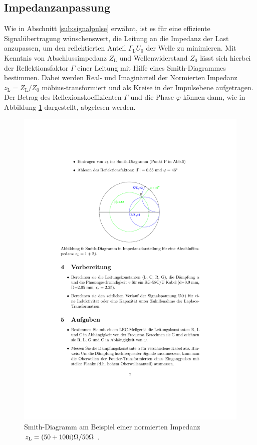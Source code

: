 \subsection{Impedanzanpassung} %
\label{sub:impedanzanpassung}
Wie in Abschnitt \ref{sub:signalpulse} erwähnt, ist es für eine effiziente
Signalübertragung wünschenswert, die Leitung an die Impedanz der Last
anzupassen, um den reflektierten Anteil $\Gamma_\text{L}U_0$ der Welle zu
minimieren.
Mit Kenntnis von Abschlussimpedanz $Z_\text{L}$ und Wellenwiderstand $Z_0$
lässt sich hierbei der Reflektionsfaktor $\Gamma$ einer Leitung mit Hilfe
eines Smith-Diagrammes bestimmen.
Dabei werden Real- und Imaginärteil der Normierten Impedanz
$z_\text{L} = Z_\text{L}/Z_0$ möbius-transformiert und als Kreise in der
Impulsebene aufgetragen.
Der Betrag des Reflexionskoeffizienten $\Gamma$ und die Phase $\varphi$ können
dann, wie in Abbildung \ref{fig:smith} dargestellt, abgelesen werden.
\begin{figure}
    \centering
    \includegraphics[width=0.7\linewidth]{img/smith.pdf}
    \caption{
        Smith-Diagramm am Beispiel einer normierten Impedanz
        $z_\text{L} = (\num{50}+\num{100}\mathrm{i})\si{\ohm}/\num{50}\si{\ohm}$
        \cite{E02}.
    }
    \label{fig:smith}
\end{figure}
